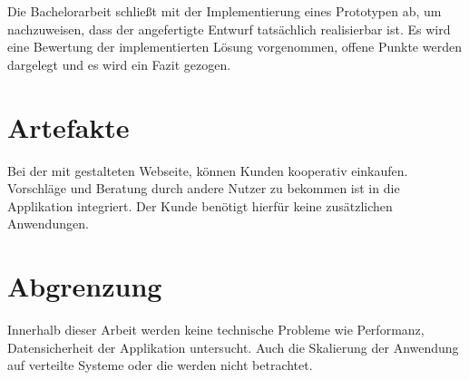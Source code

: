 Die Bachelorarbeit schließt mit der Implementierung eines Prototypen ab, um nachzuweisen, dass der angefertigte Entwurf tatsächlich realisierbar ist. Es wird eine Bewertung der implementierten Lösung vorgenommen, offene Punkte werden dargelegt und es wird ein Fazit gezogen.


\section{Artefakte}

Bei der mit  gestalteten Webseite, können Kunden kooperativ einkaufen. Vorschläge und Beratung durch andere Nutzer zu bekommen ist in die Applikation integriert. Der Kunde benötigt hierfür keine zusätzlichen Anwendungen.


\section{Abgrenzung}

Innerhalb dieser Arbeit werden keine technische Probleme wie Performanz, Datensicherheit der Applikation untersucht. Auch die Skalierung der Anwendung auf verteilte Systeme oder die  werden nicht betrachtet.
